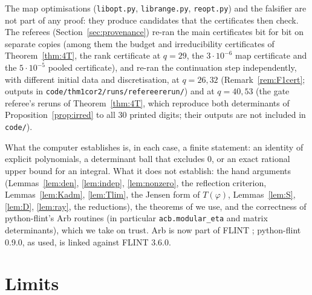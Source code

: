 \documentclass[11pt]{amsart}
\theoremstyle{definition}
\theoremstyle{remark}
\numberwithin{equation}{section}
\newcommand{\file}[1]{{\def\_{\textunderscore\allowbreak}\texttt{#1}}}
\begin{document}
The map optimisations (\file{lib\_opt.py}, \file{lib\_range.py}, \file{reopt.py}) and the falsifier are not part of any
proof: they produce candidates that the certificates then check. The referees (Section~\ref{sec:provenance}) re-ran the
main certificates bit for bit on separate copies (among them the budget and irreducibility certificates of
Theorem~\ref{thm:4T}, the rank certificate at $q=29$, the $3\cdot10^{-6}$ map certificate and the $5\cdot10^{-5}$ pooled
certificate), and re-ran the continuation step independently, with different initial data and discretisation, at
$q=26,32$ (Remark~\ref{rem:F1cert}; outputs in \file{code/thm1\_cor2/runs/referee\_rerun/}) and at $q=40,53$ (the gate
referee's reruns of Theorem~\ref{thm:4T}, which reproduce both determinants of Proposition~\ref{prop:irred} to all $30$
printed digits; their outputs are not included in \file{code/}).

What the computer establishes is, in each case, a finite statement: an identity of explicit polynomials, a determinant
ball that excludes $0$, or an exact rational upper bound for an integral. What it does not establish: the hand arguments
(Lemmas~\ref{lem:den}, \ref{lem:indep}, \ref{lem:nonzero}, the reflection criterion, Lemmas~\ref{lem:Kadm},
\ref{lem:Tlim}, the Jensen form of $T(\varphi)$, Lemmas~\ref{lem:S}, \ref{lem:D}, \ref{lem:ray}, the reductions), the theorems of \cite{CDT} we use, and the correctness of python-flint's Arb routines
(in particular \texttt{acb.modular\_eta} and matrix determinants), which we take on trust. Arb \cite{Arb} is now part of FLINT \cite{FLINT}; python-flint
\cite{pyflint} 0.9.0, as used, is linked against FLINT 3.6.0.

\section{Limits}\label{sec:limits}
\end{document}
